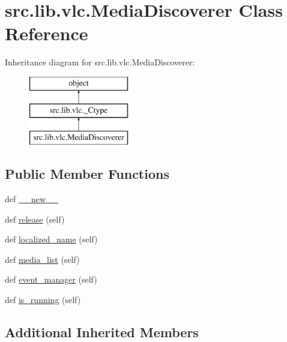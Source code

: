\hypertarget{classsrc_1_1lib_1_1vlc_1_1MediaDiscoverer}{}\section{src.\+lib.\+vlc.\+Media\+Discoverer Class Reference}
\label{classsrc_1_1lib_1_1vlc_1_1MediaDiscoverer}
Inheritance diagram for src.\+lib.\+vlc.\+Media\+Discoverer\+:\begin{figure}[H]
\begin{center}
\leavevmode
\includegraphics[height=3.000000cm]{classsrc_1_1lib_1_1vlc_1_1MediaDiscoverer}
\end{center}
\end{figure}
\subsection*{Public Member Functions}
\begin{DoxyCompactItemize}
\item 
def \hyperlink{classsrc_1_1lib_1_1vlc_1_1MediaDiscoverer_a7c299935815ecc37c8b6f06712550fb1}{\+\_\+\+\_\+new\+\_\+\+\_\+}
\item 
def \hyperlink{classsrc_1_1lib_1_1vlc_1_1MediaDiscoverer_aae27da52a978a76c1389aa19fa976a9b}{release} (self)
\item 
def \hyperlink{classsrc_1_1lib_1_1vlc_1_1MediaDiscoverer_ad9d0e9d2259970390c1432db14e0b9a5}{localized\+\_\+name} (self)
\item 
def \hyperlink{classsrc_1_1lib_1_1vlc_1_1MediaDiscoverer_ad265055daf05e3b7eb359c7ff0a29bb8}{media\+\_\+list} (self)
\item 
def \hyperlink{classsrc_1_1lib_1_1vlc_1_1MediaDiscoverer_ac9c5181fa862a3ea80fc4d1abdeb0b65}{event\+\_\+manager} (self)
\item 
def \hyperlink{classsrc_1_1lib_1_1vlc_1_1MediaDiscoverer_a353666dc1662f726584044886af40895}{is\+\_\+running} (self)
\end{DoxyCompactItemize}
\subsection*{Additional Inherited Members}


